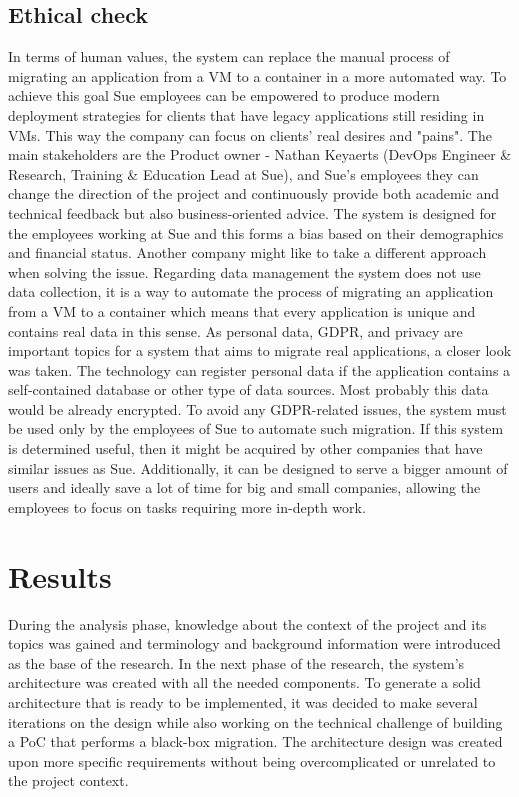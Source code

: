 \documentclass{article}
\begin{document}
\begin{multicols}{2}
\subsection{Ethical check}
In terms of human values, the system can replace the manual process of migrating an application from a VM to a container in a more automated way. To achieve this goal Sue employees can be empowered to produce modern deployment strategies for clients that have legacy applications still residing in VMs. This way the company can focus on clients' real desires and "pains". The main stakeholders are the Product owner - Nathan Keyaerts (DevOps Engineer \& Research, Training \& Education Lead at Sue), and Sue's employees they can change the direction of the project and continuously provide both academic and technical feedback but also business-oriented advice. The system is designed for the employees working at Sue and this forms a bias based on their demographics and financial status. Another company might like to take a different approach when solving the issue. Regarding data management the system does not use data collection, it is a way to automate the process of migrating an application from a VM to a container which means that every application is unique and contains real data in this sense. As personal data, GDPR, and privacy are important topics for a system that aims to migrate real applications, a closer look was taken. The technology can register personal data if the application contains a self-contained database or other type of data sources. Most probably this data would be already encrypted. To avoid any GDPR-related issues, the system must be used only by the employees of Sue to automate such migration. If this system is determined useful, then it might be acquired by other companies that have similar issues as Sue. Additionally, it can be designed to serve a bigger amount of users and ideally save a lot of time for big and small companies, allowing the employees to focus on tasks requiring more in-depth work.

\section{Results}
During the analysis phase, knowledge about the context of the project and its topics was gained and terminology and background information were introduced as the base of the research. In the next phase of the research, the system's architecture was created with all the needed components. To generate a solid architecture that is ready to be implemented, it was decided to make several iterations on the design while also working on the technical challenge of building a PoC that performs a black-box migration. The architecture design was created upon more specific requirements without being overcomplicated or unrelated to the project context.


\end{multicols}
\end{document}

